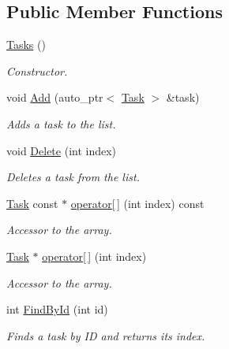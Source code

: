 \subsection*{Public Member Functions}
\begin{DoxyCompactItemize}
\item 
\hypertarget{class_model_1_1_tasks_ac6ee174f91f1e37e0189f22dbd65f748}{\hyperlink{class_model_1_1_tasks_ac6ee174f91f1e37e0189f22dbd65f748}{Tasks} ()}\label{class_model_1_1_tasks_ac6ee174f91f1e37e0189f22dbd65f748}

\begin{DoxyCompactList}\small\item\em Constructor. \end{DoxyCompactList}\item 
void \hyperlink{class_model_1_1_tasks_ada8481fd74feccd1c6d3b6969426ff00}{Add} (auto\-\_\-ptr$<$ \hyperlink{class_model_1_1_task}{Task} $>$ \&task)
\begin{DoxyCompactList}\small\item\em Adds a task to the list. \end{DoxyCompactList}\item 
void \hyperlink{class_model_1_1_tasks_a5a31b2d893e47f1a9c9dd6dbcaa37ef0}{Delete} (int index)
\begin{DoxyCompactList}\small\item\em Deletes a task from the list. \end{DoxyCompactList}\item 
\hyperlink{class_model_1_1_task}{Task} const $\ast$ \hyperlink{class_model_1_1_tasks_a2db64ec936b5080f59e43e7403b7ff23}{operator\mbox{[}$\,$\mbox{]}} (int index) const 
\begin{DoxyCompactList}\small\item\em Accessor to the array. \end{DoxyCompactList}\item 
\hyperlink{class_model_1_1_task}{Task} $\ast$ \hyperlink{class_model_1_1_tasks_acb440c2d39f40f972e16e3bd19ecba11}{operator\mbox{[}$\,$\mbox{]}} (int index)
\begin{DoxyCompactList}\small\item\em Accessor to the array. \end{DoxyCompactList}\item 
int \hyperlink{class_model_1_1_tasks_a0e48d6e7bc3c74d3975fecf86a7dc33e}{Find\-By\-Id} (int id)
\begin{DoxyCompactList}\small\item\em Finds a task by I\-D and returns its index. \end{DoxyCompactList}\item 

\end{DoxyCompactItemize}
